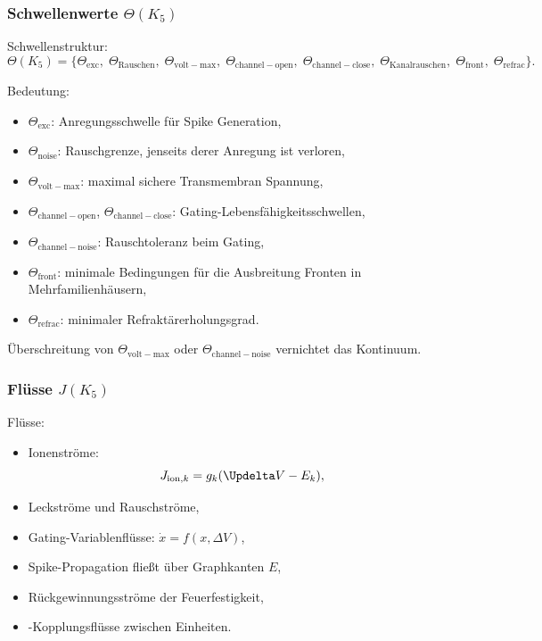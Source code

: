 \subsubsection{Schwellenwerte \texorpdfstring{$\Theta(K_5)$}{\Theta(K_5)}}

Schwellenstruktur:
\[
\Theta(K_5)=\{
\Theta_{\mathrm{exc}},\;
\Theta_{\mathrm{Rauschen}},\;
\Theta_{\mathrm{volt-max}},\;
\Theta_{\mathrm{channel-open}},\;
\Theta_{\mathrm{channel-close}},\;
\Theta_{\mathrm{Kanalrauschen}},\;
\Theta_{\mathrm{front}},\;
\Theta_{\mathrm{refrac}}
\}.
\]

Bedeutung:
\begin{itemize}
    \item $\Theta_{\mathrm{exc}}$: Anregungsschwelle für Spike
          Generation,
    \item $\Theta_{\mathrm{noise}}$: Rauschgrenze, jenseits derer Anregung
          ist verloren,
    \item $\Theta_{\mathrm{volt-max}}$: maximal sichere Transmembran
          Spannung,
    \item $\Theta_{\mathrm{channel-open}}$, $\Theta_{\mathrm{channel-close}}$:
          Gating-Lebensfähigkeitsschwellen,
    \item $\Theta_{\mathrm{channel-noise}}$: Rauschtoleranz beim Gating,
    \item $\Theta_{\mathrm{front}}$: minimale Bedingungen für die Ausbreitung
          Fronten in Mehrfamilienhäusern,
    \item $\Theta_{\mathrm{refrac}}$: minimaler Refraktärerholungsgrad.
\end{itemize}

Überschreitung von $\Theta_{\mathrm{volt-max}}$ oder $\Theta_{\mathrm{channel-noise}}$
vernichtet das Kontinuum.

\subsubsection{Flüsse \texorpdfstring{$J(K_5)$}{J(K_5)}}

Flüsse:
\begin{itemize}
    \item Ionenströme:
    \[
    J_{\mathrm{ion},k} = g_k(\Updelta V - E_k),
    \]
    \item Leckströme und Rauschströme,
    \item Gating-Variablenflüsse:
          $\dot{x} = f(x,\Delta V)$,
    \item Spike-Propagation fließt über Graphkanten $E$,
    \item Rückgewinnungsströme der Feuerfestigkeit,
    \item-Kopplungsflüsse zwischen Einheiten.
\end{itemize}

